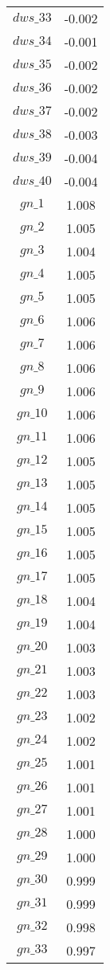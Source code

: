 \begin{center}
\begin{longtable}{cc}
$dws\_33$ 	 & 	 -0.002 \\
$dws\_34$ 	 & 	 -0.001 \\
$dws\_35$ 	 & 	 -0.002 \\
$dws\_36$ 	 & 	 -0.002 \\
$dws\_37$ 	 & 	 -0.002 \\
$dws\_38$ 	 & 	 -0.003 \\
$dws\_39$ 	 & 	 -0.004 \\
$dws\_40$ 	 & 	 -0.004 \\
$gn\_1$ 	 & 	 1.008 \\
$gn\_2$ 	 & 	 1.005 \\
$gn\_3$ 	 & 	 1.004 \\
$gn\_4$ 	 & 	 1.005 \\
$gn\_5$ 	 & 	 1.005 \\
$gn\_6$ 	 & 	 1.006 \\
$gn\_7$ 	 & 	 1.006 \\
$gn\_8$ 	 & 	 1.006 \\
$gn\_9$ 	 & 	 1.006 \\
$gn\_10$ 	 & 	 1.006 \\
$gn\_11$ 	 & 	 1.006 \\
$gn\_12$ 	 & 	 1.005 \\
$gn\_13$ 	 & 	 1.005 \\
$gn\_14$ 	 & 	 1.005 \\
$gn\_15$ 	 & 	 1.005 \\
$gn\_16$ 	 & 	 1.005 \\
$gn\_17$ 	 & 	 1.005 \\
$gn\_18$ 	 & 	 1.004 \\
$gn\_19$ 	 & 	 1.004 \\
$gn\_20$ 	 & 	 1.003 \\
$gn\_21$ 	 & 	 1.003 \\
$gn\_22$ 	 & 	 1.003 \\
$gn\_23$ 	 & 	 1.002 \\
$gn\_24$ 	 & 	 1.002 \\
$gn\_25$ 	 & 	 1.001 \\
$gn\_26$ 	 & 	 1.001 \\
$gn\_27$ 	 & 	 1.001 \\
$gn\_28$ 	 & 	 1.000 \\
$gn\_29$ 	 & 	 1.000 \\
$gn\_30$ 	 & 	 0.999 \\
$gn\_31$ 	 & 	 0.999 \\
$gn\_32$ 	 & 	 0.998 \\
$gn\_33$ 	 & 	 0.997 \\

\end{longtable}
\end{center}

